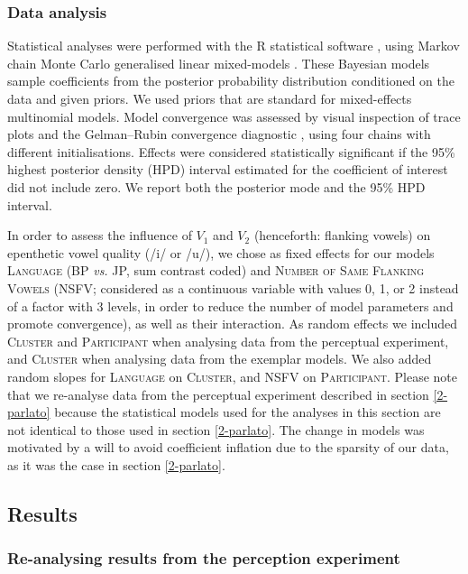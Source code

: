 \subsubsection{Data analysis}
Statistical analyses were performed with the R statistical software \cite{R-base}, using Markov chain Monte Carlo generalised linear mixed-models \cite{R-MCMCglmm, R-coda}. These Bayesian models sample coefficients from the posterior probability distribution conditioned on the data and given priors. We used priors that are standard for mixed-effects multinomial models. Model convergence was assessed by visual inspection of trace plots and the Gelman–Rubin convergence diagnostic \cite{gelman1992}, using four chains with different initialisations. Effects were considered statistically significant if the 95\% highest posterior density (HPD) interval estimated for the coefficient of interest did not include zero. We report both the posterior mode and the 95\% HPD interval.  

In order to assess the influence of $V_{1}$ and $V_{2}$ (henceforth: flanking vowels) on epenthetic vowel quality (/i/ or /u/), we chose as fixed effects for our models \textsc{Language} (BP \textit{vs.} JP, sum contrast coded) and \textsc{Number of Same Flanking Vowels} (\textsc{NSFV}; considered as a continuous variable with values 0, 1, or 2 instead of a factor with 3 levels, in order to reduce the number of model parameters and promote convergence), as well as their interaction. As random effects we included \textsc{Cluster} and \textsc{Participant} when analysing data from the perceptual experiment, and \textsc{Cluster} when analysing data from the exemplar models. We also added random slopes for \textsc{Language} on \textsc{Cluster}, and \textsc{NSFV} on \textsc{Participant}. Please note that we re-analyse data from the perceptual experiment described in section \ref{2-parlato} because the statistical models used for the analyses in this section are not identical to those used in section \ref{2-parlato}. The change in models was motivated by a will to avoid coefficient inflation due to the sparsity of our data, as it was the case in section \ref{2-parlato}. 

\subsection{Results} 
\subsubsection{Re-analysing results from the perception experiment}

